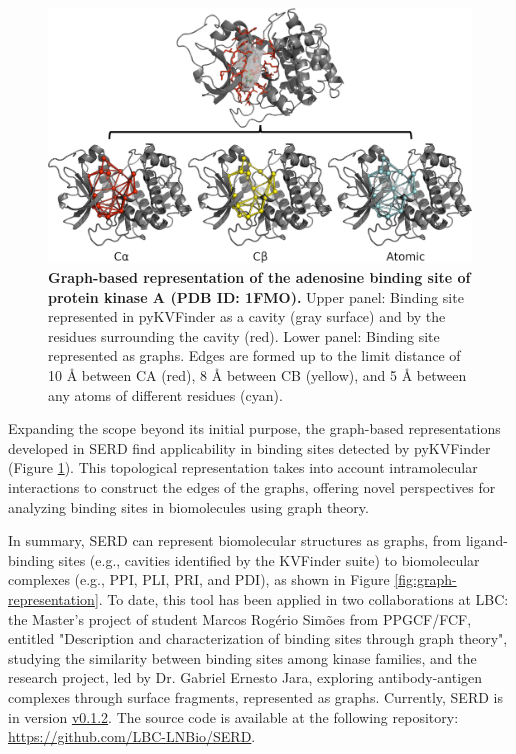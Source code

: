 \documentclass[Ingles]{phdthesis}
\def\eg{e.g.\onedot}
\begin{document}
\begin{figure}[H]
  \centering
  \includegraphics[scale=0.75]{images/graph-representation-of-binding-sites.png}
  \caption[Graph-based representation of the adenosine binding site of protein kinase A.]{\textbf{Graph-based representation of the adenosine binding site of protein kinase A (PDB ID: 1FMO).} Upper panel: Binding site represented in pyKVFinder as a cavity (gray surface) and by the residues surrounding the cavity (red). Lower panel: Binding site represented as graphs. Edges are formed up to the limit distance of 10 Å between \acs{CA} (red), 8 Å between \acs{CB} (yellow), and 5 Å between any atoms of different residues (cyan).}
  \label{fig:serd-cavity}
\end{figure}

Expanding the scope beyond its initial purpose, the graph-based representations developed in SERD find applicability in binding sites detected by pyKVFinder (Figure \ref{fig:serd-cavity}). This topological representation takes into account intramolecular interactions to construct the edges of the graphs, offering novel perspectives for analyzing binding sites in biomolecules using graph theory.


In summary, SERD can represent biomolecular structures as graphs, from ligand-binding sites (\eg, cavities identified by the KVFinder suite) to biomolecular complexes (\eg, \acs{PPI}, \acs{PLI}, \acs{PRI}, and \acs{PDI}), as shown in Figure \ref{fig:graph-representation}. To date, this tool has been applied in two collaborations at \acs{LBC}: the Master's project of student Marcos Rogério Simões from \acs{PPGCF}/\acs{FCF}, entitled "Description and characterization of binding sites through graph theory", studying the similarity between binding sites among kinase families, and the research project, led by Dr. Gabriel Ernesto Jara, exploring antibody-antigen complexes through surface fragments, represented as graphs. Currently, \acs{SERD} is in version \href{https://github.com/LBC-LNBio/SERD/releases/tag/v0.1.2}{v0.1.2}. The source code is available at the following repository: \url{https://github.com/LBC-LNBio/SERD}.
\end{document}
